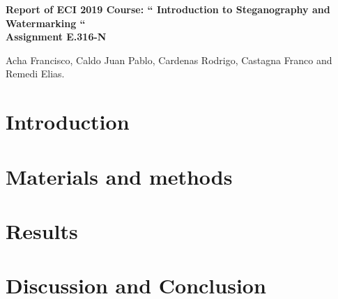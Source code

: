 \documentclass[11pt]{article}
\begin{document}
\pagestyle{empty}

\begin{center}

{\Large {\bf Report of ECI 2019 Course: `` Introduction to Steganography and Watermarking ``}} \\

\bigskip
{\large \bf Assignment E.316-N}
\end{center}

\begin{center}
Acha Francisco, Caldo Juan Pablo, Cardenas Rodrigo, Castagna Franco and Remedi Elias.
\end{center}


\section{Introduction}


\section{Materials and methods}

\section{Results}

\section{Discussion and Conclusion}
\end{document}
